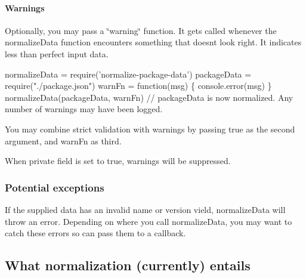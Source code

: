 \paragraph*{Warnings}

Optionally, you may pass a \char`\"{}warning\char`\"{} function. It gets called whenever the {\ttfamily normalize\+Data} function encounters something that doesn\textquotesingle{}t look right. It indicates less than perfect input data.


\begin{DoxyCode}
normalizeData = require('normalize-package-data')
packageData = require("./package.json")
warnFn = function(msg) \{ console.error(msg) \}
normalizeData(packageData, warnFn)
// packageData is now normalized. Any number of warnings may have been logged.
\end{DoxyCode}


You may combine strict validation with warnings by passing {\ttfamily true} as the second argument, and {\ttfamily warn\+Fn} as third.

When {\ttfamily private} field is set to {\ttfamily true}, warnings will be suppressed.

\subsubsection*{Potential exceptions}

If the supplied data has an invalid name or version vield, {\ttfamily normalize\+Data} will throw an error. Depending on where you call {\ttfamily normalize\+Data}, you may want to catch these errors so can pass them to a callback.

\subsection*{What normalization (currently) entails}


